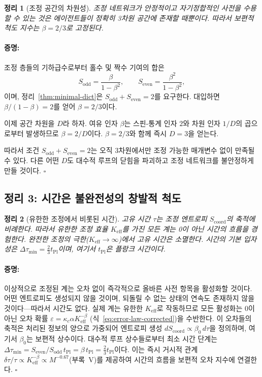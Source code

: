 \documentclass[12pt,a4paper]{article}
\newtheorem{theorem}{정리}[section]
\theoremstyle{remark}
\renewenvironment{proof}{\paragraph{증명:}}{\hfill$\square$}
\newcommand{\tPl}{t_{\mathrm{Pl}}}
\newcommand{\Scoord}{S_{\mathrm{coord}}}
\begin{document}
	\begin{theorem}[조정 공간의 차원성]
		\label{thm:dimension}
		조정 네트워크가 안정적이고 자기정합적인 사전을 수용할 수 있는 것은 에이전트들이 정확히 3차원 공간에 존재할 때뿐이다. 따라서 보편적 척도 지수는 \(\beta = 2/3\)로 고정된다.
	\end{theorem}
	
	\begin{proof}
		조정 층들의 기하급수로부터 홀수 및 짝수 기여의 합은
		\[
		S_{\mathrm{odd}} = \frac{\beta}{1-\beta^2}, \qquad
		S_{\mathrm{even}} = \frac{\beta^2}{1-\beta^2},
		\]
		이며, 정리~\ref{thm:minimal-dict}은 \(S_{\mathrm{odd}} + S_{\mathrm{even}} = 2\)를 요구한다. 대입하면 \(\beta/(1-\beta) = 2\)를 얻어 \(\beta = 2/3\)이다.
		
		이제 공간 차원을 \(D\)라 하자. 여유 인자 \(\beta\)는 스핀-통계 인자 \(2\)와 차원 인자 \(1/D\)의 곱으로부터 발생하므로 \(\beta = 2/D\)이다. \(\beta = 2/3\)와 함께 즉시 \(D = 3\)을 얻는다.
		
		따라서 조건 \(S_{\mathrm{odd}} + S_{\mathrm{even}} = 2\)는 오직 3차원에서만 조정 가능한 매개변수 없이 만족될 수 있다. 다른 어떤 \(D\)도 대수적 루프의 닫힘을 파괴하고 조정 네트워크를 불안정하게 만들 것이다.
	\end{proof}
	
	\subsection{정리 3: 시간은 불완전성의 창발적 척도}
	
	\begin{theorem}[유한한 조정에서 비롯된 시간]
		\label{thm:time}
		고유 시간 \(\tau\)는 조정 엔트로피 \(\Scoord\)의 축적에 비례한다. 따라서 유한한 조정 효율 \(K_{\mathrm{eff}}\)를 가진 모든 계는 0이 아닌 시간의 흐름을 경험한다. 완전한 조정의 극한(\(K_{\mathrm{eff}} \to \infty\))에서 고유 시간은 소멸한다. 시간의 기본 입자성은 \(\Delta \tau_{\min} = \frac{2}{3} \tPl\)이며, 여기서 \(\tPl\)은 플랑크 시간이다.
	\end{theorem}
	
	\begin{proof}
		이상적으로 조정된 계는 오차 없이 즉각적으로 올바른 사전 항목을 활성화할 것이다. 어떤 엔트로피도 생성되지 않을 것이며, 되돌릴 수 없는 상태의 연속도 존재하지 않을 것이다—따라서 시간도 없다. 실제 계는 유한한 \(K_{\mathrm{eff}}\)로 작동하므로 모든 활성화는 0이 아닌 오차 확률 \(\varepsilon = \kappa_c \alpha K_{\mathrm{eff}}^{-\beta}\) (식~\ref{eq:error-law-corrected})을 수반한다. 이 오차들의 축적은 처리된 정보의 양으로 가중되어 엔트로피 생성 \(d\Scoord \propto \beta_0 \, d\tau\)을 정의하며, 여기서 \(\beta_0\)는 보편적 상수이다. 대수적 루프 상수들로부터 최소 시간 단계는 \(\Delta \tau_{\min} = S_{\mathrm{even}}/S_{\mathrm{odd}} \, \tPl = \beta \, \tPl = \frac{2}{3} \tPl\)이다. 이는 즉시 거시적 관계 \(\delta\tau/\tau \propto K_{\mathrm{eff}}^{-\beta} \propto M^{-0.67}\)(부록~V)를 제공하여 시간의 흐름을 보편적 오차 지수에 연결한다.
	\end{proof}
	
\end{document}

